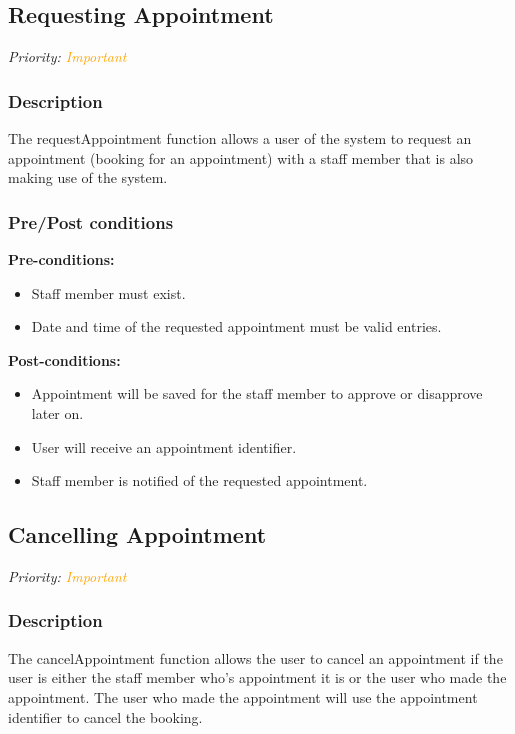 \subsection{Requesting Appointment}
\textit{Priority: \textcolor{orange}{Important}} 

\subsubsection{ Description}
The requestAppointment function allows a user of the system to request an appointment (booking for an appointment) with a staff member that is also making use of the system. \\

\subsubsection{Pre/Post conditions}
\textbf{Pre-conditions:} 
	\begin{itemize}
		\item Staff member must exist.
		\item Date and time of the requested appointment must be valid entries.
	\end{itemize}
\textbf{Post-conditions:} 
	\begin{itemize}
		\item Appointment will be saved for the staff member to approve or disapprove later on.
		\item User will receive an appointment identifier.
		\item Staff member is notified of the requested appointment. 
	\end{itemize}



\subsection{Cancelling Appointment}
\textit{Priority: \textcolor{orange}{Important}} 

\subsubsection{Description}
The cancelAppointment function allows the user to cancel an appointment if the user is either the staff member who's appointment it is or the user who made the appointment. The user who made the appointment will use the appointment identifier to cancel the booking. \\

